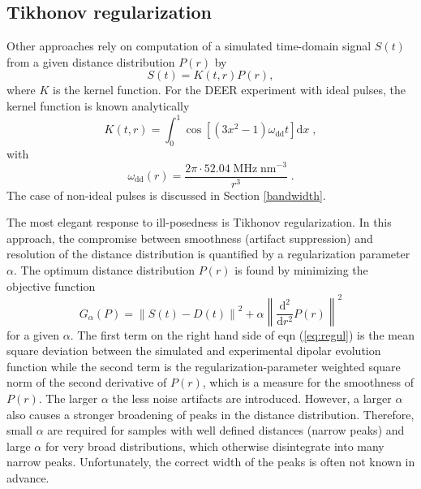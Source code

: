 \documentclass{article}
\begin{document}
\subsection{Tikhonov regularization}

Other approaches rely on computation of a simulated time-domain signal $S(t)$ from
a given distance distribution $P(r)$ by
\begin{equation}
	S \left( t \right) = K \left( t, r \right) P \left( r \right) ,
\end{equation}
where $K$ is the kernel function. For the DEER experiment with ideal pulses, the kernel function is known analytically
\begin{equation}
	K \left( t, r \right) = \int _0 ^1 \cos \left[ \left( 3x^2-1 \right) \omega_{\mathrm{dd}} t \right] \mathrm{d}x \; ,
	\label{eq:ideal_kernel}
\end{equation}
with
\begin{equation}
	\omega_{\mathrm{dd}} \left( r \right) = \frac{2 \pi \cdot 52.04 \; \mathrm{MHz} \; \mathrm{nm}^{-3}}{r^3} \; .
\end{equation}
The case of non-ideal pulses is discussed in Section \ref{bandwidth}.

The most elegant response to ill-posedness is Tikhonov regularization. In this approach, the compromise between smoothness (artifact suppression) and resolution of the distance distribution is quantified by a regularization parameter $\alpha$. The optimum distance distribution $P(r)$ is found by minimizing the objective function
\begin{equation}
	G_{\alpha} \left( P \right) = \left\| S \left( t \right) - D \left( t \right)  \right\|^2 + \alpha \left\| \frac{\mathrm{d}^2}{\mathrm{d}r^2} P \left( r \right) \right\|^2
	\label{eq:regul}
\end{equation}
for a given $\alpha$. The first term on the right hand side of eqn (\ref{eq:regul}) is the mean square deviation between the simulated and experimental dipolar evolution function while the second term is the regularization-parameter weighted square norm of the second derivative of $P(r)$, which is a measure for the smoothness of $P(r)$. The larger $\alpha$ the less noise artifacts are introduced. However, a larger $\alpha$ also causes a stronger broadening of peaks in the distance distribution. Therefore, small $\alpha$ are required for samples with well defined distances (narrow peaks) and large $\alpha$ for very broad distributions, which otherwise disintegrate into many narrow peaks. Unfortunately, the correct width of the peaks is often not known in advance.  
\end{document}
